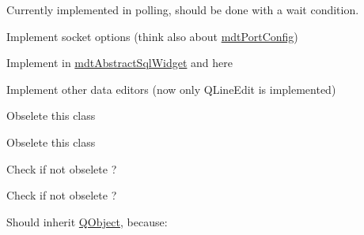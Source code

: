 \begin{DoxyRefList}
\item[\label{todo__todo000028}%
\hypertarget{todo__todo000028}{}%
Member \hyperlink{classmdt_port_thread_helper_aed853f4cedc143c62e7dad5e38ff4b8c}{mdt\-Port\-Thread\-Helper\-:\-:get\-New\-Frame\-Read} ()]Currently implemented in polling, should be done with a wait condition. 
\item[\label{todo__todo000029}%
\hypertarget{todo__todo000029}{}%
Member \hyperlink{classmdt_port_thread_helper_socket_aa77afb8d26e4863bd437e0d59efae7a7}{mdt\-Port\-Thread\-Helper\-Socket\-:\-:mdt\-Port\-Thread\-Helper\-Socket} (\hyperlink{class_q_object}{Q\-Object} $\ast$parent=0)]Implement socket options (think also about \hyperlink{classmdt_port_config}{mdt\-Port\-Config})  
\item[\label{todo__todo000083}%
\hypertarget{todo__todo000083}{}%
Member \hyperlink{classmdt_sql_dialog_old_a658d4a0a9bc97cb8a354a5b2157ab1a0}{mdt\-Sql\-Dialog\-Old\-:\-:set\-Current\-Row} (const Q\-List$<$ Q\-Pair$<$ Q\-String, Q\-Variant $>$ $>$ \&match\-List)]Implement in \hyperlink{classmdt_abstract_sql_widget}{mdt\-Abstract\-Sql\-Widget} and here  
\item[\label{todo__todo000084}%
\hypertarget{todo__todo000084}{}%
Class \hyperlink{classmdt_sql_field_handler_abstract_data_widget}{mdt\-Sql\-Field\-Handler\-Abstract\-Data\-Widget} ]Implement other data editors (now only Q\-Line\-Edit is implemented)  
\item[\label{todo__todo000085}%
\hypertarget{todo__todo000085}{}%
Class \hyperlink{classmdt_sql_form_dialog}{mdt\-Sql\-Form\-Dialog} ]Obselete this class  
\item[\label{todo__todo000086}%
\hypertarget{todo__todo000086}{}%
Class \hyperlink{classmdt_sql_form_window}{mdt\-Sql\-Form\-Window} ]Obselete this class  
\item[\label{todo__todo000089}%
\hypertarget{todo__todo000089}{}%
Class \hyperlink{classmdt_sql_table_model}{mdt\-Sql\-Table\-Model} ]Check if not obselete ?  
\item[\label{todo__todo000088}%
\hypertarget{todo__todo000088}{}%
Member \hyperlink{classmdt_sql_table_model_ad423c1b0c74ecbbb575637b028c2574b}{mdt\-Sql\-Table\-Model\-:\-:mdt\-Sql\-Table\-Model} (\hyperlink{class_q_object}{Q\-Object} $\ast$parent=0, Q\-Sql\-Database db=Q\-Sql\-Database())]Check if not obselete ?  
\item[\label{todo__todo000051}%
\hypertarget{todo__todo000051}{}%
Class \hyperlink{classmdt_tt_base}{mdt\-Tt\-Base} ]Should inherit \hyperlink{class_q_object}{Q\-Object}, because\-:
\begin{DoxyItemize}

\end{DoxyItemize}
\end{DoxyRefList}
